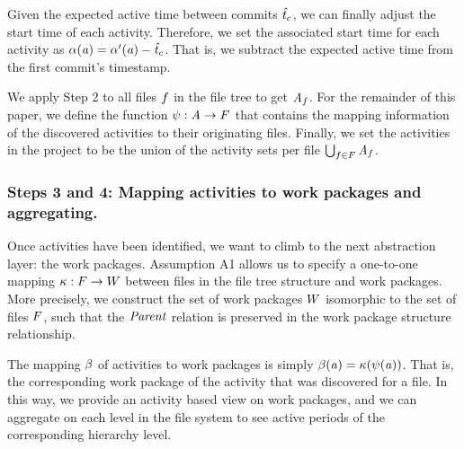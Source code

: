 Given the expected active time between commits $\mathit{\hat{t}_{c}}$, we can finally adjust the start time of each activity. Therefore, we set the associated start time for each activity as $\alpha(\mathit{a}) = \alpha'(\mathit{a}) - \mathit{\hat{t}_{c}}$. That is, we subtract the expected active time from the first commit's timestamp.

We apply Step 2 to all files $f$ in the file tree to get $\mathit{A}_f$. For the remainder of this paper, we define the function $\psi : \mathit{A} \rightarrow F$ that contains the mapping information of the discovered activities to their originating files. Finally, we set the activities \Activities in the project to be the union of the activity sets per file $\bigcup_{f \in F} \mathit{A}_f$.

%


\subsubsection{Steps 3 and 4: Mapping activities to work packages and aggregating.}
Once activities have been identified, we want to climb to the next abstraction layer: the work packages. Assumption A1 allows us to specify a one-to-one mapping $\kappa : F \rightarrow W$ between files in the file tree structure and work packages. More precisely, we construct the set of work packages $W$ isomorphic to the set of files $F$, such that the $\mathit{Parent}$ relation is preserved in the work package structure \Structure relationship. %

The mapping $\beta$ of activities to work packages is simply $\beta(\mathit{a}) = \kappa (\psi(\mathit{a}))$. That is, the corresponding work package of the activity that was discovered for a file.
In this way, we provide an activity based view on work packages, and we can aggregate on each level in the file system to see active periods of the corresponding hierarchy level.


